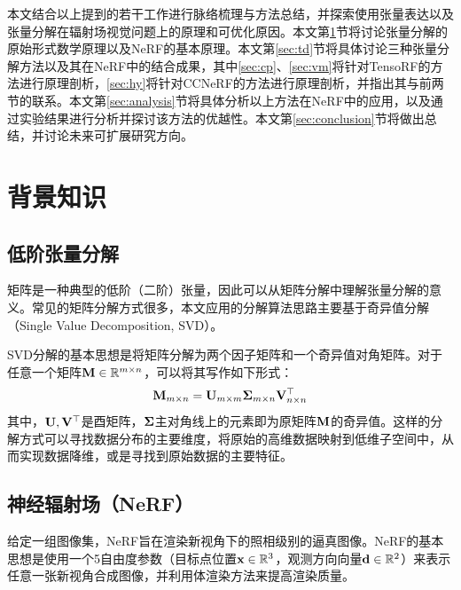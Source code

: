 \documentclass[10pt,twocolumn,letterpaper]{article}
\begin{document}
本文结合以上提到的若干工作进行脉络梳理与方法总结，并探索使用张量表达以及张量分解在辐射场视觉问题上的原理和可优化原因。本文第\ref{sec:related_work}节将讨论张量分解的原始形式数学原理以及NeRF的基本原理。本文第\ref{sec:td}节将具体讨论三种张量分解方法以及其在NeRF中的结合成果，其中\ref{sec:cp}、\ref{sec:vm}将针对TensoRF\cite{chen2022tensorf}的方法进行原理剖析，\ref{sec:hy}将针对CCNeRF\cite{tang2022ccnerf}的方法进行原理剖析，并指出其与前两节的联系。本文第\ref{sec:analysis}节将具体分析以上方法在NeRF中的应用，以及通过实验结果进行分析并探讨该方法的优越性。本文第\ref{sec:conclusion}节将做出总结，并讨论未来可扩展研究方向。
\section{背景知识}
\label{sec:related_work}

\subsection{低阶张量分解}
矩阵是一种典型的低阶（二阶）张量，因此可以从矩阵分解中理解张量分解的意义。常见的矩阵分解方式很多，本文应用的分解算法思路主要基于奇异值分解（Single Value Decomposition, SVD）\cite{hoecker1996svd}。

SVD分解的基本思想是将矩阵分解为两个因子矩阵和一个奇异值对角矩阵。对于任意一个矩阵$\bold M\in\mathbb R^{m\times n}$，可以将其写作如下形式：
\begin{equation}
  \bold M_{m\times n} = \bold U_{m\times m} \bold \Sigma_{m\times n} \bold V_{n\times n}^\top
\end{equation}
\label{eq:1}
其中，$\bold U, \bold V^\top$是酉矩阵，$\bold \Sigma$主对角线上的元素即为原矩阵$\bold M$的奇异值。这样的分解方式可以寻找数据分布的主要维度，将原始的高维数据映射到低维子空间中，从而实现数据降维，或是寻找到原始数据的主要特征。

\subsection{神经辐射场（NeRF）}
给定一组图像集，NeRF旨在渲染新视角下的照相级别的逼真图像。NeRF的基本思想是使用一个5自由度参数（目标点位置$\bold x\in\mathbb R^3$，观测方向向量$\bold d\in\mathbb R^2$）来表示任意一张新视角合成图像，并利用体渲染方法来提高渲染质量。
\end{document}
